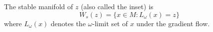 The stable manifold of $z$ (also called the inset) is
$$W_s(z) = \{x \in M : L_\omega(x) = z\}$$
where $L_\omega(x)$ denotes the $\omega$-limit set of $x$ under the gradient flow.
